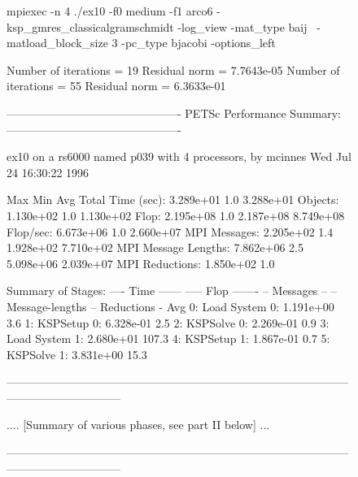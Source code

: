 \begin{figure}[tb]
  \begin{outputlisting}[\tiny\ttfamily] 
mpiexec -n 4 ./ex10 -f0 medium -f1 arco6 -ksp_gmres_classicalgramschmidt -log_view -mat_type baij \
            -matload_block_size 3 -pc_type bjacobi -options_left

Number of iterations =  19
Residual norm = 7.7643e-05
Number of iterations =  55
Residual norm = 6.3633e-01

---------------------------------------------- PETSc Performance Summary: ----------------------------------------------

ex10 on a rs6000 named p039 with 4 processors, by mcinnes Wed Jul 24 16:30:22 1996

                         Max         Min        Avg        Total
Time (sec):           3.289e+01      1.0   3.288e+01
Objects:              1.130e+02      1.0   1.130e+02
Flop:                 2.195e+08      1.0   2.187e+08   8.749e+08
Flop/sec:             6.673e+06      1.0               2.660e+07
MPI Messages:         2.205e+02      1.4   1.928e+02   7.710e+02
MPI Message Lengths:  7.862e+06      2.5   5.098e+06   2.039e+07
MPI Reductions:       1.850e+02      1.0

Summary of Stages:  ---- Time ------  ----- Flop  -------  -- Messages -- -- Message-lengths -- Reductions -
                      Avg      %
 0:  Load System 0: 1.191e+00    3.6%
 1:    KSPSetup 0:  6.328e-01    2.5%
 2:    KSPSolve 0:  2.269e-01    0.9%
 3:  Load System 1: 2.680e+01  107.3%
 4:    KSPSetup 1:  1.867e-01    0.7%
 5:    KSPSolve 1:  3.831e+00   15.3%

------------------------------------------------------------------------------------------------------------------------

.... [Summary of various phases, see part II below] ...

------------------------------------------------------------------------------------------------------------------------


\end{outputlisting}
\end{figure}
